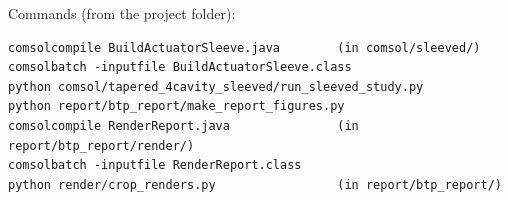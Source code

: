 \documentclass[12pt,a4paper,oneside]{report}
\numberwithin{equation}{chapter}
\numberwithin{figure}{chapter}
\numberwithin{table}{chapter}
\begin{document}
\noindent Commands (from the project folder):
\begin{small}
\begin{verbatim}
comsolcompile BuildActuatorSleeve.java        (in comsol/sleeved/)
comsolbatch -inputfile BuildActuatorSleeve.class
python comsol/tapered_4cavity_sleeved/run_sleeved_study.py
python report/btp_report/make_report_figures.py
comsolcompile RenderReport.java               (in report/btp_report/render/)
comsolbatch -inputfile RenderReport.class
python render/crop_renders.py                 (in report/btp_report/)
\end{verbatim}
\end{small}
\end{document}
